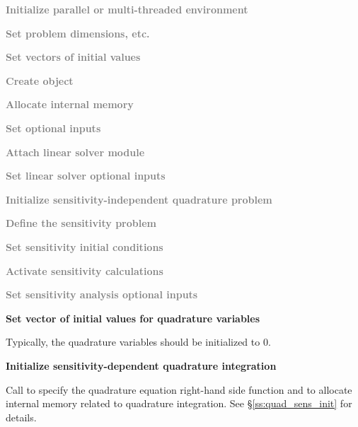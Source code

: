 \begin{Steps}
  
\item 
  \textcolor{gray}{\bf Initialize parallel or multi-threaded environment}

\item
  \textcolor{gray}{\bf Set problem dimensions, etc.}

\item
  \textcolor{gray}{\bf Set vectors of initial values}
 
\item
  \textcolor{gray}{\bf Create {\idas} object}

\item
  \textcolor{gray}{\bf Allocate internal memory}

\item
  \textcolor{gray}{\bf Set optional inputs}

\item
  \textcolor{gray}{\bf Attach linear solver module}

\item
  \textcolor{gray}{\bf Set linear solver optional inputs}

\item
  \textcolor{gray}{\bf Initialize sensitivity-independent quadrature problem}

\item\label{i:quad_sens_sens_def}
  \textcolor{gray}{\bf Define the sensitivity problem}

\item
  \textcolor{gray}{\bf Set sensitivity initial conditions}

\item
  \textcolor{gray}{\bf Activate sensitivity calculations}

\item
  \textcolor{gray}{\bf Set sensitivity analysis optional inputs}

\item
  {\bf Set vector of initial values for quadrature variables}

  Typically, the quadrature variables should be initialized to $0$.

\item\label{i:quad_sens_init}
  {\bf Initialize sensitivity-dependent quadrature integration}

  Call  to specify the quadrature equation right-hand
  side function and to allocate internal memory related to quadrature integration. 
  See \S\ref{ss:quad_sens_init} for details.


\end{Steps}
